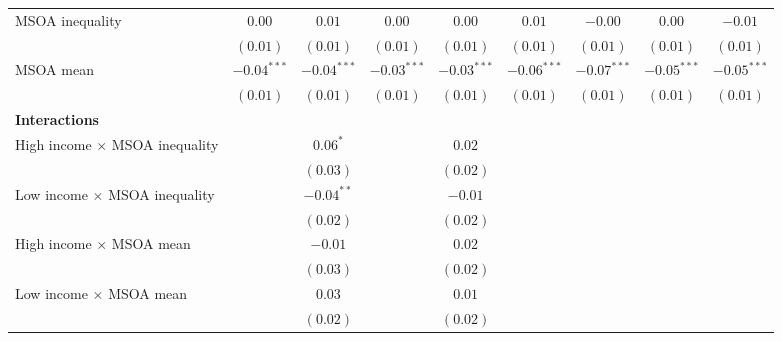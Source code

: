 \documentclass[12pt, letter]{scrartcl}
\begin{document}
\begin{table}[t]
{\begin{tabular}{l c c c c c c c c}
MSOA inequality                             & $0.00$        & $0.01$        & $0.00$        & $0.00$        & $0.01$        & $-0.00$       & $0.00$        & $-0.01$       \\
                                            & $(0.01)$      & $(0.01)$      & $(0.01)$      & $(0.01)$      & $(0.01)$      & $(0.01)$      & $(0.01)$      & $(0.01)$      \\
MSOA mean                                   & $-0.04^{***}$ & $-0.04^{***}$ & $-0.03^{***}$ & $-0.03^{***}$ & $-0.06^{***}$ & $-0.07^{***}$ & $-0.05^{***}$ & $-0.05^{***}$ \\
                                            & $(0.01)$      & $(0.01)$      & $(0.01)$      & $(0.01)$      & $(0.01)$      & $(0.01)$      & $(0.01)$      & $(0.01)$      \\
\multicolumn{5}{l}{\textbf{Interactions}} \\[5pt]
High income $\times$ MSOA inequality        &               & $0.06^{*}$    &               & $0.02$        &               &               &               &               \\
                                            &               & $(0.03)$      &               & $(0.02)$      &               &               &               &               \\
Low income $\times$ MSOA inequality         &               & $-0.04^{**}$  &               & $-0.01$       &               &               &               &               \\
                                            &               & $(0.02)$      &               & $(0.02)$      &               &               &               &               \\
High income $\times$ MSOA mean              &               & $-0.01$       &               & $0.02$        &               &               &               &               \\
                                            &               & $(0.03)$      &               & $(0.02)$      &               &               &               &               \\
Low income $\times$ MSOA mean               &               & $0.03$        &               & $0.01$        &               &               &               &               \\
                                            &               & $(0.02)$      &               & $(0.02)$      &               &               &               &               \\

\end{tabular}}
\end{table}
\end{document}
